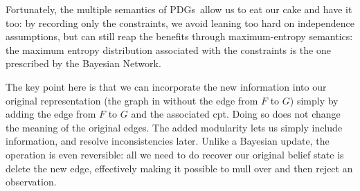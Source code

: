 \documentclass{article}
\newcommand{\MN}{PDG}
\newcommand{\MNs}{\MN s}
\numberwithin{equation}{section}
\begin{document}
\begin{notfocus}
\begin{example}
\begin{vfull}
{			Fortunately, the multiple semantics of \MNs\ allow us to eat our cake and have it too: by recording only the constraints, we avoid leaning too hard on independence assumptions, but can still reap the benefits through maximum-entropy semantics: the maximum entropy distribution associated with the constraints is the one prescribed by the Bayesian Network.
		}
		\end{vfull}
	
		The key point here is that we can incorporate the new information into
		our original representation (the graph in 
		without the edge from $F$ to $G$) simply  by adding the edge from $F$
		to $G$ and the associated cpt.  Doing so does not change the meaning
		of the original edges.  The added modularity lets us simply include
		information, and resolve inconsistencies later. Unlike a Bayesian
		update, the operation is even reversible: all we need to do recover
		our original belief state is delete the new edge, effectively making
		it possible to mull over and then reject an observation.
	\end{example}


\end{notfocus}
\end{document}
